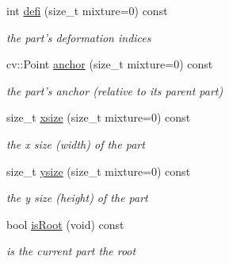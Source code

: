 \begin{DoxyCompactItemize}
int \hyperlink{class_component_part_ae1d71f86350d8757e33bbeb1af85f4fa}{defi} (size\-\_\-t mixture=0) const 
\begin{DoxyCompactList}\small\item\em the part's deformation indices \end{DoxyCompactList}\item 
cv\-::\-Point \hyperlink{class_component_part_a7e2cdd67c7a6a7c66826ac9b5c4ce372}{anchor} (size\-\_\-t mixture=0) const 
\begin{DoxyCompactList}\small\item\em the part's anchor (relative to its parent part) \end{DoxyCompactList}\item 
size\-\_\-t \hyperlink{class_component_part_a2a0785678aa70d37132c13671204bb55}{xsize} (size\-\_\-t mixture=0) const 
\begin{DoxyCompactList}\small\item\em the x size (width) of the part \end{DoxyCompactList}\item 
size\-\_\-t \hyperlink{class_component_part_a7db69e2def014c1b9c0e7ea9d7315354}{ysize} (size\-\_\-t mixture=0) const 
\begin{DoxyCompactList}\small\item\em the y size (height) of the part \end{DoxyCompactList}\item 
bool \hyperlink{class_component_part_a5c2cb9582276cb9cfa11cd9ba95aac85}{is\-Root} (void) const 
\begin{DoxyCompactList}\small\item\em is the current part the root \end{DoxyCompactList}\end{DoxyCompactItemize}
